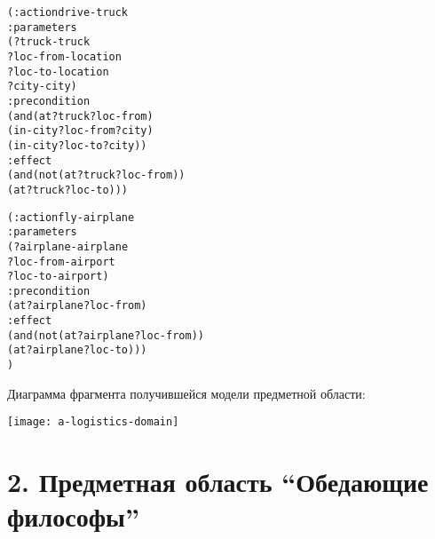 \begin{mdframed}[style=excode]
\begin{alltt}
  (:action drive-truck
    :parameters
        (?truck - truck
         ?loc-from - location
         ?loc-to - location
         ?city - city)
    :precondition
        (and    (at ?truck ?loc-from)
            (in-city ?loc-from ?city)
            (in-city ?loc-to ?city))
    :effect
        (and    (not (at ?truck ?loc-from)) 
            (at ?truck ?loc-to)))

  (:action fly-airplane
    :parameters
        (?airplane - airplane
         ?loc-from - airport
         ?loc-to - airport)
    :precondition
        (at ?airplane ?loc-from)
    :effect
        (and    (not (at ?airplane ?loc-from)) 
        (at ?airplane ?loc-to)))
)

\end{alltt}
\end{mdframed}

Диаграмма фрагмента получившейся модели предметной области:\\

\centerline{
    \texttt{[image: a-logistics-domain]}
}

\newpage

\def\sname{2. Предметная область ``Обедающие философы''}
\section*{\sname}

